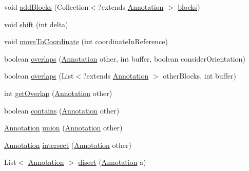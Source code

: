 \begin{DoxyCompactItemize}
\item 
void \hyperlink{classumms_1_1core_1_1annotation_1_1_basic_annotation_ac3505dace44b8b9c47fef79963be33aa}{add\+Blocks} (Collection$<$?extends \hyperlink{interfaceumms_1_1core_1_1annotation_1_1_annotation}{Annotation} $>$ \hyperlink{classumms_1_1core_1_1annotation_1_1_basic_annotation_a8d54dfeeeaf679fd40a2c3bb5a2db3e0}{blocks})
\item 
void \hyperlink{classumms_1_1core_1_1annotation_1_1_basic_annotation_abca261c2fa9c7851c23c2af956b77264}{shift} (int delta)
\item 
void \hyperlink{classumms_1_1core_1_1annotation_1_1_basic_annotation_a2e654b6c118a9b3cf6b728737f9a1b47}{move\+To\+Coordinate} (int coordinate\+In\+Reference)
\item 
boolean \hyperlink{classumms_1_1core_1_1annotation_1_1_basic_annotation_a91e6cee09bf0c878c84b018cf4e91576}{overlaps} (\hyperlink{interfaceumms_1_1core_1_1annotation_1_1_annotation}{Annotation} other, int buffer, boolean consider\+Orientation)
\item 
boolean \hyperlink{classumms_1_1core_1_1annotation_1_1_basic_annotation_a39437ef5b903d34c90e07a295703b479}{overlaps} (List$<$?extends \hyperlink{interfaceumms_1_1core_1_1annotation_1_1_annotation}{Annotation} $>$ other\+Blocks, int buffer)
\item 
int \hyperlink{classumms_1_1core_1_1annotation_1_1_basic_annotation_a23906f94da29ba7bd51a057b822fe916}{get\+Overlap} (\hyperlink{interfaceumms_1_1core_1_1annotation_1_1_annotation}{Annotation} other)
\item 
boolean \hyperlink{classumms_1_1core_1_1annotation_1_1_basic_annotation_a25d8463822c9b3236fce57bef3e3cf2a}{contains} (\hyperlink{interfaceumms_1_1core_1_1annotation_1_1_annotation}{Annotation} other)
\item 
\hyperlink{interfaceumms_1_1core_1_1annotation_1_1_annotation}{Annotation} \hyperlink{classumms_1_1core_1_1annotation_1_1_basic_annotation_ad7b14a1ab9f3f42d19ee495ed8e46985}{union} (\hyperlink{interfaceumms_1_1core_1_1annotation_1_1_annotation}{Annotation} other)
\item 
\hyperlink{interfaceumms_1_1core_1_1annotation_1_1_annotation}{Annotation} \hyperlink{classumms_1_1core_1_1annotation_1_1_basic_annotation_a9dc464c6ce3b4805fde6ddcb5fc9745c}{intersect} (\hyperlink{interfaceumms_1_1core_1_1annotation_1_1_annotation}{Annotation} other)
\item 
List$<$ \hyperlink{interfaceumms_1_1core_1_1annotation_1_1_annotation}{Annotation} $>$ \hyperlink{classumms_1_1core_1_1annotation_1_1_basic_annotation_a4768d36c78bd82536d6ae685850426c0}{disect} (\hyperlink{interfaceumms_1_1core_1_1annotation_1_1_annotation}{Annotation} a)

\end{DoxyCompactItemize}
